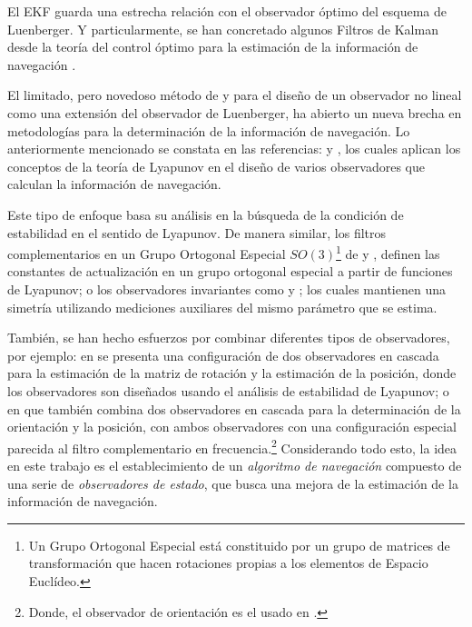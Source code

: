 \documentclass[conference]{IEEEtran}
\begin{document}
El EKF guarda una estrecha relación con el observador óptimo del esquema de Luenberger. Y particularmente, se han concretado algunos Filtros de Kalman desde la teoría del control óptimo para la estimación de la información de navegación \cite{Smith1995}.\par
%
El limitado, pero novedoso método de \cite{Kou1975} y \cite{Thau1973} para el diseño de un observador no lineal como una extensión del observador de Luenberger, ha abierto un nueva brecha en metodologías para la determinación de la información de navegación. Lo anteriormente mencionado se constata en las referencias: \cite{Vik2001,Thienel2003} y \cite{Hua2009}, los cuales aplican los conceptos de la teoría de Lyapunov en el diseño de varios observadores que calculan la información de navegación.\par
Este tipo de enfoque basa su análisis en la búsqueda de la condición de estabilidad en el sentido de Lyapunov. De manera similar, los filtros complementarios en un Grupo Ortogonal Especial $SO(3)$\footnote{Un Grupo Ortogonal Especial está constituido por un grupo de matrices de transformación que hacen rotaciones propias a los elementos de Espacio Euclídeo.} de \cite{Mahony2008} y \cite{Scandaro2011}, definen las constantes de actualización en un grupo ortogonal especial a partir de funciones de Lyapunov; o los observadores invariantes como \cite{Bonabel2008} y \cite{Martin2008}; los cuales mantienen una simetría utilizando mediciones auxiliares del mismo parámetro que se estima. %
\par
%
También, se han hecho esfuerzos por combinar diferentes tipos de observadores, por ejemplo: en \cite{Vasconcelos2008} se presenta una configuración de dos observadores en cascada para la estimación de la matriz de rotación y la estimación de la posición, donde los observadores son diseñados usando el análisis de estabilidad de Lyapunov; o en \cite{Scandaro2011} que también combina dos observadores en cascada para la determinación de la orientación y la posición, con ambos observadores con una configuración especial parecida al filtro complementario en frecuencia.\footnote{Donde, el observador de orientación es el usado en \cite{Mahony2008}. }
Considerando todo esto, la idea en este trabajo es el establecimiento de un \emph{algoritmo de navegación} compuesto de una serie de \emph{observadores de estado}, que busca una mejora de la estimación de la información de navegación.\par
\end{document}
